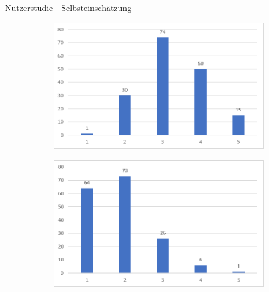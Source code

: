 \begin{frame}{Nutzerstudie - Selbsteinschätzung}
    \begin{figure}[h]
        \begin{subfigure}[c]{0.49\textwidth}
            \centering        
            \includegraphics[scale=0.2]{../../media/diagram/eigenesWissen.png}
        \end{subfigure}
        \begin{subfigure}[c]{0.49\textwidth}
            \centering        
            \includegraphics[scale=0.2]{../../media/diagram/WichtigkeitVonInfos.png}
        \end{subfigure}
    \end{figure}
\end{frame}
